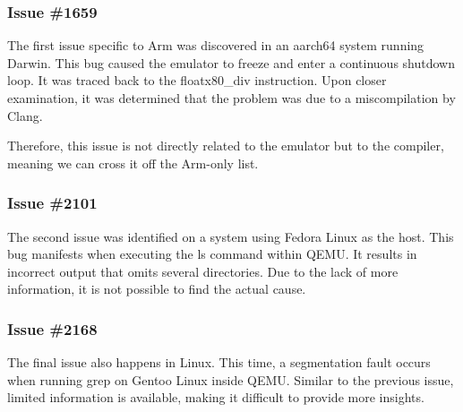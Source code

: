 \subsubsection{Issue \#1659 \cite{qemu_1659}}
The first issue specific to Arm was discovered in an aarch64 system running Darwin.
This bug caused the emulator to freeze and enter a continuous shutdown loop.
It was traced back to the floatx80\_div instruction.
Upon closer examination, it was determined that the problem was due to a miscompilation by Clang.

Therefore, this issue is not directly related to the emulator but to the compiler, meaning we can cross it off the Arm-only list.

\subsubsection{Issue \#2101 \cite{qemu_2101}}
The second issue was identified on a system using Fedora Linux as the host.
This bug manifests when executing the ls command within \ac{QEMU}.
It results in incorrect output that omits several directories.
Due to the lack of more information, it is not possible to find the actual cause.

\subsubsection{Issue \#2168 \cite{qemu_2168}}
The final issue also happens in Linux.
This time, a segmentation fault occurs when running grep on Gentoo Linux inside \ac{QEMU}.
Similar to the previous issue, limited information is available, making it difficult to provide more insights.
